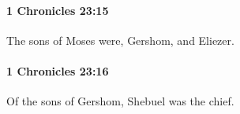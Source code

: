 		\paragraph{1 Chronicles 23:15} %
			\label{1CHRONICLES-23-15}

			The sons of Moses were, Gershom, and Eliezer.


		\paragraph{1 Chronicles 23:16} %
			\label{1CHRONICLES-23-16}

			Of the sons of Gershom, Shebuel was the chief.


